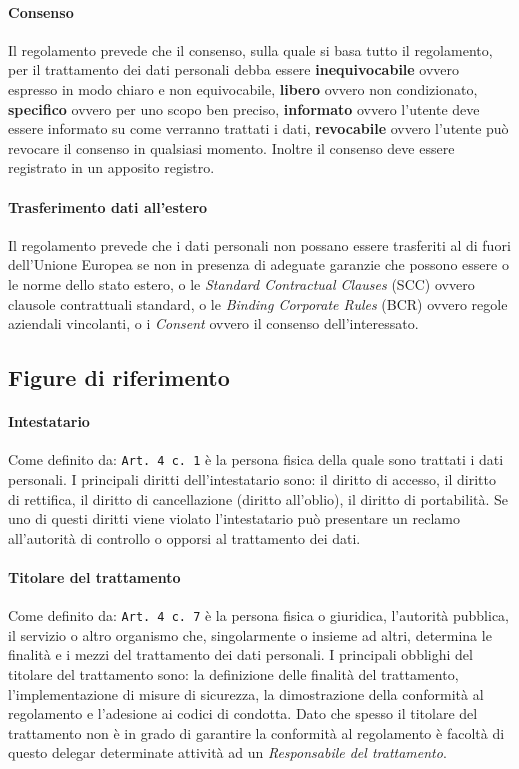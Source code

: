 {        \paragraph{Consenso} Il regolamento prevede che il consenso, sulla quale si basa tutto il regolamento, per il trattamento dei dati personali debba essere \textbf{inequivocabile} ovvero espresso in modo chiaro e non equivocabile, \textbf{libero} ovvero non condizionato, \textbf{specifico} ovvero per uno scopo ben preciso, \textbf{informato} ovvero l'utente deve essere informato su come verranno trattati i dati, \textbf{revocabile} ovvero l'utente può revocare il consenso in qualsiasi momento. Inoltre il consenso deve essere registrato in un apposito registro.
        \paragraph{Trasferimento dati all'estero} Il regolamento prevede che i dati personali non possano essere trasferiti al di fuori dell'Unione Europea se non in presenza di adeguate garanzie che possono essere o le norme dello stato estero, o le \textit{Standard Contractual Clauses} (SCC) ovvero clausole contrattuali standard, o le \textit{Binding Corporate Rules} (BCR) ovvero regole aziendali vincolanti, o i \textit{Consent} ovvero il consenso dell'interessato.
    \subsection{Figure di riferimento}
        \paragraph{Intestatario} Come definito da: \texttt{Art. 4 c. 1} è la persona fisica della quale sono trattati i dati personali. I principali diritti dell'intestatario sono: il diritto di accesso, il diritto di rettifica, il diritto di cancellazione (diritto all'oblio), il diritto di portabilità. Se uno di questi diritti viene violato l'intestatario può presentare un reclamo all'autorità di controllo o opporsi al trattamento dei dati.
        \paragraph{Titolare del trattamento} Come definito da: \texttt{Art. 4 c. 7} è la persona fisica o giuridica, l'autorità pubblica, il servizio o altro organismo che, singolarmente o insieme ad altri, determina le finalità e i mezzi del trattamento dei dati personali. I principali obblighi del titolare del trattamento sono: la definizione delle finalità del trattamento, l'implementazione di misure di sicurezza, la dimostrazione della conformità al regolamento e l'adesione ai codici di condotta. Dato che spesso il titolare del trattamento non è in grado di garantire la conformità al regolamento è facoltà di questo delegar determinate attività ad un \textit{Responsabile del trattamento}.
}
